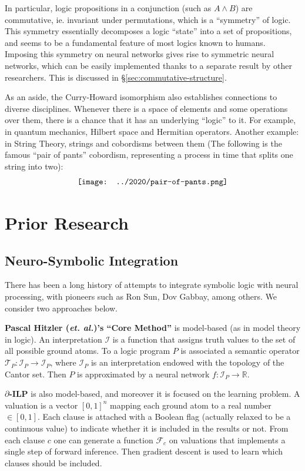 \documentclass[orivec]{llncs}
\begin{document}
In particular, logic propositions in a conjunction (such as $A \wedge B$) are commutative, ie. invariant under permutations, which is a ``symmetry'' of logic.  This symmetry essentially decomposes a logic ``state'' into a set of propositions, and seems to be a fundamental feature of most logics known to humans.  Imposing this symmetry on neural networks gives rise to symmetric neural networks, which can be easily implemented thanks to a separate result by other researchers.  This is discussed in \S\ref{sec:commutative-structure}.

As an aside, the Curry-Howard isomorphism also establishes connections to diverse disciplines.  Whenever there is a space of elements and some operations over them, there is a chance that it has an underlying ``logic'' to it.  For example, in quantum mechanics, Hilbert space and Hermitian operators.  Another example: in String Theory, strings and cobordisms between them (The following is the famous ``pair of pants'' cobordism, representing a process in time that splits one string into two):
\begin{equation}
\vcenter{\hbox{\texttt{[image: ../2020/pair-of-pants.png]}}}
\end{equation}

\section{Prior Research}

\subsection{Neuro-Symbolic Integration}

There has been a long history of attempts to integrate symbolic logic with neural processing, with pioneers such as Ron Sun, Dov Gabbay, among others.  We consider two approaches below.

\textbf{Pascal Hitzler (\textit{et. al.})'s ``Core Method''} \cite{Hitzler2011} is model-based (as in model theory in logic).  An interpretation $\mathcal{I}$ is a function that assigns truth values to the set of all possible ground atoms.  To a logic program $P$ is associated a semantic operator $\mathcal{T}_P : \mathcal{I}_P \rightarrow \mathcal{I}_P$, where $\mathcal{I}_P$ is an interpretation endowed with the topology of the Cantor set.  Then $P$ is approximated by a neural network $f: \mathcal{I}_P \rightarrow \mathbb{R}$.

\textbf{$\partial$-ILP} \cite{Evans2017} is also model-based, and moreover it is focused on the learning problem.  A valuation is a vector $[0,1]^n$ mapping each ground atom to a real number $\in [0,1]$.  Each clause is attached with a Boolean flag (actually relaxed to be a continuous value) to indicate whether it is included in the results or not.  From each clause $c$ one can generate a function $\mathcal{F}_c$ on valuations that implements a single step of forward inference.  Then gradient descent is used to learn which clauses should be included.
\end{document}
